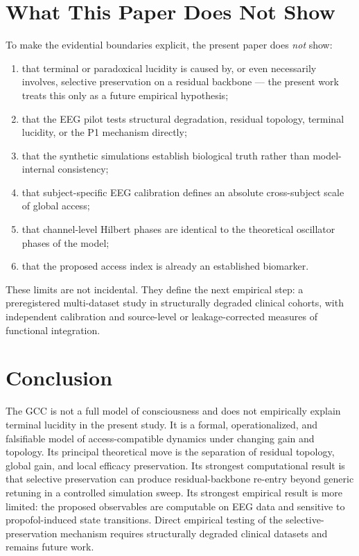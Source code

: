 ﻿\documentclass[11pt,a4paper]{article}
\theoremstyle{plain}
\theoremstyle{definition}
\theoremstyle{remark}
\begin{document}
\section{What This Paper Does Not Show}
\label{sec:not-show}

To make the evidential boundaries explicit, the present paper does \emph{not} show:
\begin{enumerate}
\item that terminal or paradoxical lucidity is caused by, or even necessarily involves, selective preservation on a residual backbone --- the present work treats this only as a future empirical hypothesis;
\item that the EEG pilot tests structural degradation, residual topology, terminal lucidity, or the P1 mechanism directly;
\item that the synthetic simulations establish biological truth rather than model-internal consistency;
\item that subject-specific EEG calibration defines an absolute cross-subject scale of global access;
\item that channel-level Hilbert phases are identical to the theoretical oscillator phases of the model;
\item that the proposed access index is already an established biomarker.
\end{enumerate}

These limits are not incidental. They define the next empirical step: a preregistered multi-dataset study in structurally degraded clinical cohorts, with independent calibration and source-level or leakage-corrected measures of functional integration.

\section{Conclusion}
\label{sec:schluss}

The GCC is not a full model of consciousness and does not empirically explain terminal lucidity in the present study. It is a formal, operationalized, and falsifiable model of access-compatible dynamics under changing gain and topology. Its principal theoretical move is the separation of residual topology, global gain, and local efficacy preservation. Its strongest computational result is that selective preservation can produce residual-backbone re-entry beyond generic retuning in a controlled simulation sweep. Its strongest empirical result is more limited: the proposed observables are computable on EEG data and sensitive to propofol-induced state transitions. Direct empirical testing of the selective-preservation mechanism requires structurally degraded clinical datasets and remains future work.
\end{document}
